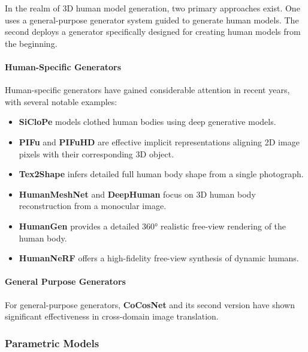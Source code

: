 In the realm of 3D human model generation, two primary approaches exist. One
uses a general-purpose generator system guided to generate human models. The
second deploys a generator specifically designed for creating human models from
the beginning.

\paragraph{Human-Specific Generators}

Human-specific generators have gained considerable attention in recent years,
with several notable examples:

\begin{itemize}
	\item \textbf{SiCloPe} \cite{DBLP:journals/corr/abs-1901-00049} models clothed human bodies using deep generative models.
	\item \textbf{PIFu} and \textbf{PIFuHD} \cite{pifu, pifuhd} are effective implicit representations aligning 2D image pixels with their corresponding 3D object.
	\item \textbf{Tex2Shape} \cite{alldieck2019tex2shape} infers detailed full human body shape from a single photograph.
	\item \textbf{HumanMeshNet} \cite{DBLP:journals/corr/abs-1908-06544} and \textbf{DeepHuman} \cite{DBLP:journals/corr/abs-1903-06473} focus on 3D human body reconstruction from a monocular image.
	\item \textbf{HumanGen} \cite{jiang2022humangen} provides a detailed 360° realistic free-view rendering of the human body.
	\item \textbf{HumanNeRF} \cite{weng_humannerf_2022_cvpr} offers a high-fidelity free-view synthesis of dynamic humans.
\end{itemize}

\paragraph{General Purpose Generators}

For general-purpose generators, \textbf{CoCosNet} and its second version
\cite{CoCosNet, CoCosNet2} have shown significant effectiveness in cross-domain
image translation.

\subsubsection{Parametric Models}

